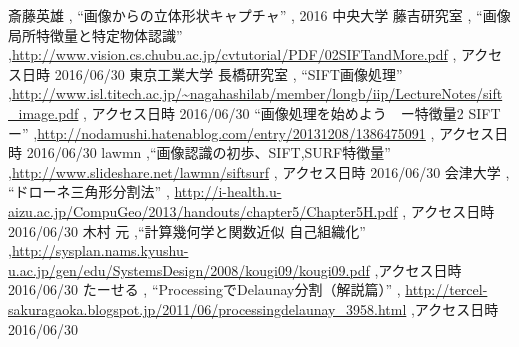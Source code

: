 \documentclass[11pt,a4j]{jsarticle}
\begin{document}
\begin{thebibliography}{9} %
 斎藤英雄 , ``画像からの立体形状キャプチャ'' , 2016
 中央大学 藤吉研究室 , ``画像局所特徴量と特定物体認識'' ,\url{http://www.vision.cs.chubu.ac.jp/cvtutorial/PDF/02SIFTandMore.pdf} , アクセス日時 2016/06/30
 東京工業大学 長橋研究室 , ``SIFT画像処理'' ,\url{http://www.isl.titech.ac.jp/~nagahashilab/member/longb/iip/LectureNotes/sift_image.pdf} , アクセス日時 2016/06/30
 ``画像処理を始めよう　ー特徴量2 SIFTー'' ,\url{http://nodamushi.hatenablog.com/entry/20131208/1386475091} , アクセス日時 2016/06/30
 lawmn ,``画像認識の初歩、SIFT,SURF特徴量'' ,\url{http://www.slideshare.net/lawmn/siftsurf} , アクセス日時 2016/06/30
 会津大学 , ``ドローネ三角形分割法'' , \url{http://i-health.u-aizu.ac.jp/CompuGeo/2013/handouts/chapter5/Chapter5H.pdf} , アクセス日時 2016/06/30
 木村 元 ,``計算幾何学と関数近似 自己組織化'' ,\url{http://sysplan.nams.kyushu-u.ac.jp/gen/edu/SystemsDesign/2008/kougi09/kougi09.pdf} ,アクセス日時 2016/06/30
 たーせる , ``ProcessingでDelaunay分割（解説篇）'' , \url{http://tercel-sakuragaoka.blogspot.jp/2011/06/processingdelaunay_3958.html} ,アクセス日時 2016/06/30
\end{thebibliography}
\end{document}
